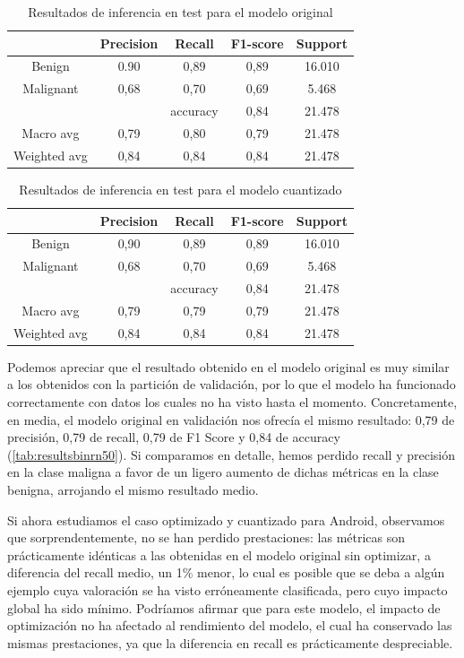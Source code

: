 \begin{table}[!ht]
	\centering
	\begin{tabular}{|c|c|c|c|c|}
		\hline
		~ & Precision & Recall & F1-score & Support \\ \hline
		Benign & 0.90 & 0,89 & 0,89 & 16.010 \\ 
		Malignant & 0,68 & 0,70 & 0,69 & 5.468 \\ \hline
		~ & ~ & accuracy & 0,84 & 21.478 \\ \hline
		Macro avg & 0,79 & 0,80 & 0,79 & 21.478 \\ 
		Weighted avg & 0,84 & 0,84 & 0,84 & 21.478 \\ \hline
	\end{tabular}
	\caption{Resultados de inferencia en test para el modelo original}
	\label{tab:bintestorig}
\end{table}



\begin{table}[!ht]
	\centering
	\begin{tabular}{|c|c|c|c|c|}
		\hline
		~ & Precision & Recall & F1-score & Support \\ \hline
		Benign & 0,90 & 0,89 & 0,89 & 16.010 \\ 
		Malignant & 0,68 & 0,70 & 0,69 & 5.468 \\ \hline
		~ & ~ & accuracy & 0,84 & 21.478 \\ \hline
		Macro avg & 0,79 & 0,79 & 0,79 & 21.478 \\ 
		Weighted avg & 0,84 & 0,84 & 0,84 & 21.478 \\ \hline
	\end{tabular}
	\caption{Resultados de inferencia en test para el modelo cuantizado}
	\label{tab:bintestquant}
\end{table}

Podemos apreciar que el resultado obtenido en el modelo original es muy similar a los obtenidos con la partición de validación, por lo que el modelo ha funcionado correctamente con datos los cuales no ha visto hasta el momento. Concretamente, en media, el modelo original en validación nos ofrecía el mismo resultado:  0,79 de precisión, 0,79 de recall,  0,79  de F1 Score y 0,84 de accuracy (\ref{tab:resultsbinrn50}). Si comparamos en detalle, hemos perdido recall y precisión en la clase maligna a favor de un ligero aumento de dichas métricas en la clase benigna, arrojando el mismo resultado medio. 

Si ahora estudiamos el caso optimizado y cuantizado para Android, observamos que sorprendentemente, no se han perdido prestaciones: las métricas son prácticamente idénticas a las obtenidas en el modelo original sin optimizar, a diferencia del recall medio, un 1\% menor, lo cual es posible que se deba a algún ejemplo cuya valoración se ha visto erróneamente clasificada, pero cuyo impacto global ha sido mínimo. Podríamos afirmar que para este modelo, el impacto de optimización no ha afectado al rendimiento del modelo, el cual ha conservado las mismas prestaciones, ya que la diferencia en recall es prácticamente despreciable.

